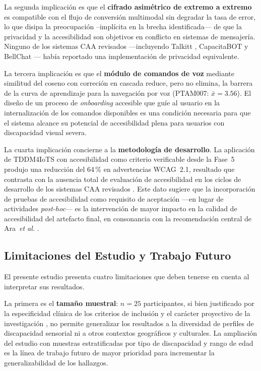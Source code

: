 \documentclass[journal]{IEEEtran}
\begin{document}
	La segunda implicaci\'on es que el \textbf{cifrado asim\'etrico de extremo a extremo} es compatible con el flujo de conversi\'on multimodal sin degradar la tasa de error, lo que disipa la preocupaci\'on --impl\'icita en la brecha identificada--- de que la privacidad y la accesibilidad son objetivos en conflicto en sistemas de mensajer\'ia. Ninguno de los sistemas CAA revisados ---incluyendo Talkitt \cite{costanzo2023}, CapacitaBOT \cite{mateos2022} y BellChat \cite{guerrero2021bellchat}--- hab\'ia reportado una implementaci\'on de privacidad equivalente.
	
	La tercera implicaci\'on es que el \textbf{m\'odulo de comandos de voz} mediante similitud del coseno con correci\'on en cascada reduce, pero no elimina, la barrera de la curva de aprendizaje para la navegaci\'on por voz (PTAM007: $\bar{x}=3.56$). El dise\~no de un proceso de \textit{onboarding} accesible que guíe al usuario en la internalizaci\'on de los comandos disponibles es una condici\'on necesaria para que el sistema alcance su potencial de accesibilidad plena para usuarios con discapacidad visual severa.
	
	La cuarta implicaci\'on concierne a la \textbf{metodolog\'ia de desarrollo}. La aplicaci\'on de TDDM4IoTS \cite{guerrero2020} con accesibilidad como criterio verificable desde la Fase~5 produjo una reducci\'on del 64\,\% en advertencias WCAG~2.1, resultado que contrasta con la ausencia total de evaluaci\'on de accesibilidad en los ciclos de desarrollo de los sistemas CAA revisados \cite{costanzo2023, mateos2022, janaka2023}. Este dato sugiere que la incorporaci\'on de pruebas de accesibilidad como requisito de aceptaci\'on ---en lugar de actividades \textit{post-hoc}--- es la intervenci\'on de mayor impacto en la calidad de accesibilidad del artefacto final, en consonancia con la recomendaci\'on central de Ara~\textit{et al.} \cite{ara2024}.
	
	\subsection{Limitaciones del Estudio y Trabajo Futuro}
	El presente estudio presenta cuatro limitaciones que deben tenerse en cuenta al interpretar sus resultados.
	
	La primera es el \textbf{tama\~no muestral}: $n=25$ participantes, si bien justificado por la especificidad cl\'inica de los criterios de inclusi\'on y el car\'acter proyectivo de la investigaci\'on \cite{hernandez2014}, no permite generalizar los resultados a la diversidad de perfiles de discapacidad sensorial ni a otros contextos geogr\'aficos y culturales. La ampliaci\'on del estudio con muestras estratificadas por tipo de discapacidad y rango de edad es la l\'inea de trabajo futuro de mayor prioridad para incrementar la generalizabilidad de los hallazgos.
	
\end{document}
